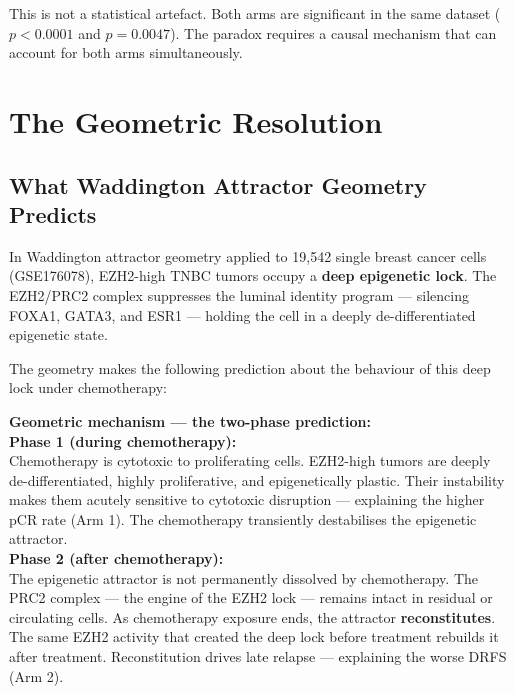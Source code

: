 \documentclass[12pt, a4paper]{article}
\begin{document}
This is not a statistical artefact. Both arms are
significant in the same dataset ($p < 0.0001$ and
$p = 0.0047$). The paradox requires a causal
mechanism that can account for both arms simultaneously.

\section{The Geometric Resolution}

\subsection{What Waddington Attractor Geometry Predicts}

In Waddington attractor geometry applied to 19,542
single breast cancer cells (GSE176078), EZH2-high
TNBC tumors occupy a \textbf{deep epigenetic lock}.
The EZH2/PRC2 complex suppresses the luminal identity
program --- silencing FOXA1, GATA3, and ESR1 ---
holding the cell in a deeply de-differentiated
epigenetic state.

The geometry makes the following prediction about
the behaviour of this deep lock under chemotherapy:

\begin{center}
\colorbox{mechanismbox}{
\begin{minipage}{0.82\textwidth}
\vspace{0.5em}
\textbf{Geometric mechanism --- the two-phase
prediction:}\\[0.4em]
\textbf{Phase 1 (during chemotherapy):}\\
Chemotherapy is cytotoxic to proliferating cells.
EZH2-high tumors are deeply de-differentiated,
highly proliferative, and epigenetically plastic.
Their instability makes them acutely sensitive to
cytotoxic disruption --- explaining the higher
pCR rate (Arm 1). The chemotherapy transiently
destabilises the epigenetic attractor.\\[0.4em]
\textbf{Phase 2 (after chemotherapy):}\\
The epigenetic attractor is not permanently
dissolved by chemotherapy. The PRC2 complex ---
the engine of the EZH2 lock --- remains intact
in residual or circulating cells. As chemotherapy
exposure ends, the attractor \textbf{reconstitutes}.
The same EZH2 activity that created the deep lock
before treatment rebuilds it after treatment.
Reconstitution drives late relapse --- explaining
the worse DRFS (Arm 2).
\vspace{0.5em}
\end{minipage}}
\end{center}
\end{document}

